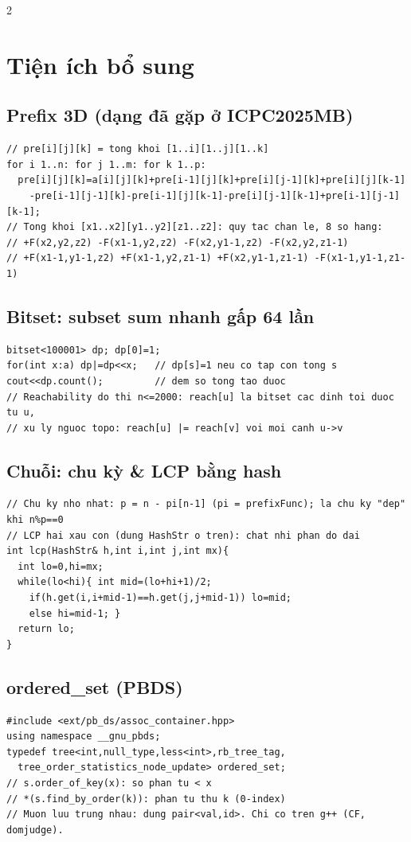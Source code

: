 \documentclass[8pt]{extarticle}
\begin{document}
\begin{multicols}{2}
\section{Tiện ích bổ sung}
\subsection{Prefix 3D (dạng đã gặp ở ICPC2025MB)}
\begin{lstlisting}
// pre[i][j][k] = tong khoi [1..i][1..j][1..k]
for i 1..n: for j 1..m: for k 1..p:
  pre[i][j][k]=a[i][j][k]+pre[i-1][j][k]+pre[i][j-1][k]+pre[i][j][k-1]
    -pre[i-1][j-1][k]-pre[i-1][j][k-1]-pre[i][j-1][k-1]+pre[i-1][j-1][k-1];
// Tong khoi [x1..x2][y1..y2][z1..z2]: quy tac chan le, 8 so hang:
// +F(x2,y2,z2) -F(x1-1,y2,z2) -F(x2,y1-1,z2) -F(x2,y2,z1-1)
// +F(x1-1,y1-1,z2) +F(x1-1,y2,z1-1) +F(x2,y1-1,z1-1) -F(x1-1,y1-1,z1-1)
\end{lstlisting}

\subsection{Bitset: subset sum nhanh gấp 64 lần}
\begin{lstlisting}
bitset<100001> dp; dp[0]=1;
for(int x:a) dp|=dp<<x;   // dp[s]=1 neu co tap con tong s
cout<<dp.count();         // dem so tong tao duoc
// Reachability do thi n<=2000: reach[u] la bitset cac dinh toi duoc tu u,
// xu ly nguoc topo: reach[u] |= reach[v] voi moi canh u->v
\end{lstlisting}

\subsection{Chuỗi: chu kỳ \& LCP bằng hash}
\begin{lstlisting}
// Chu ky nho nhat: p = n - pi[n-1] (pi = prefixFunc); la chu ky "dep" khi n%p==0
// LCP hai xau con (dung HashStr o tren): chat nhi phan do dai
int lcp(HashStr& h,int i,int j,int mx){
  int lo=0,hi=mx;
  while(lo<hi){ int mid=(lo+hi+1)/2;
    if(h.get(i,i+mid-1)==h.get(j,j+mid-1)) lo=mid;
    else hi=mid-1; }
  return lo;
}
\end{lstlisting}

\subsection{ordered\_set (PBDS)}
\begin{lstlisting}
#include <ext/pb_ds/assoc_container.hpp>
using namespace __gnu_pbds;
typedef tree<int,null_type,less<int>,rb_tree_tag,
  tree_order_statistics_node_update> ordered_set;
// s.order_of_key(x): so phan tu < x
// *(s.find_by_order(k)): phan tu thu k (0-index)
// Muon luu trung nhau: dung pair<val,id>. Chi co tren g++ (CF, domjudge).
\end{lstlisting}


\end{multicols}
\end{document}
